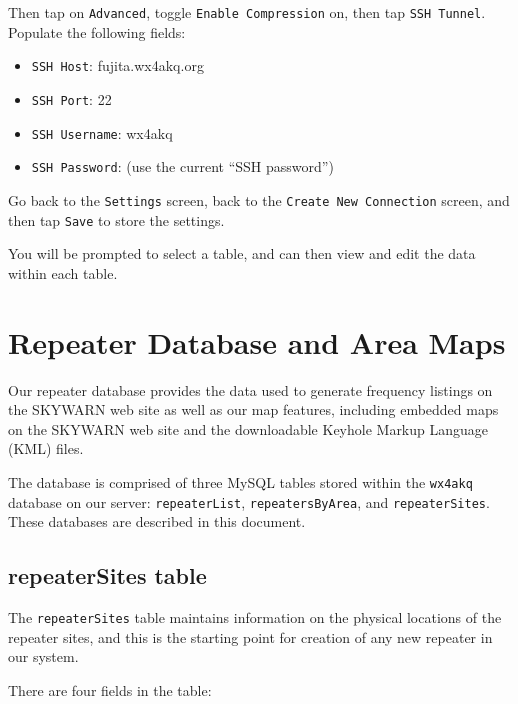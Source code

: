 \documentclass[pdflatex,letterpaper,twoside,12pt]{book}
\begin{document}
Then tap on \texttt{Advanced}, toggle \texttt{Enable Compression} on, then tap \texttt{SSH Tunnel}.  Populate the following fields:

\begin{itemize}
\item \texttt{SSH Host}: fujita.wx4akq.org
\item \texttt{SSH Port}: 22
\item \texttt{SSH Username}: wx4akq
\item \texttt{SSH Password}: (use the current ``SSH password'')
\end{itemize}

Go back to the \texttt{Settings} screen, back to the \texttt{Create New Connection} screen, and then tap \texttt{Save} to store the settings.

You will be prompted to select a table, and can then view and edit the data within each table.


\section{Repeater Database and Area Maps}

Our repeater database provides the data used to generate frequency listings on the SKYWARN web site as well as our map features, including embedded maps on the SKYWARN web site and the downloadable Keyhole Markup Language (KML) files.

The database is comprised of three MySQL tables stored within the \texttt{wx4akq} database on our server: \texttt{repeaterList}, \texttt{repeatersByArea}, and \texttt{repeaterSites}.  These databases are described in this document.

\subsection{repeaterSites table}

The \texttt{repeaterSites} table maintains information on the physical locations of the repeater sites, and this is the starting point for creation of any new repeater in our system.

There are four fields in the table:
\end{document}
